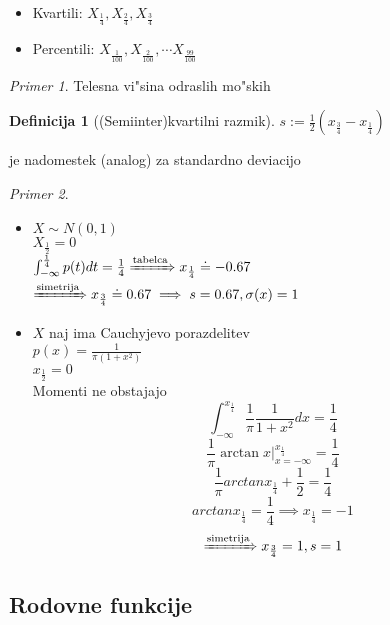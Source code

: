 \documentclass[a4paper,12pt]{article}
\theoremstyle{definition}
\newtheorem{defn}[counter]{Definicija}
\theoremstyle{remark}
\newtheorem*{ex}{Primer}
\begin{document}
\begin{itemize}
    \item Kvartili: $X_{\frac{1}{4}}, X_{\frac{2}{4}}, X_{\frac{3}{4}}$
    \item Percentili: $X_{\frac{1}{100}}, X_{\frac{2}{100}}, \cdots X_{\frac{99}{100}}$
\end{itemize}

\begin{ex}
    Telesna vi"sina odraslih mo"skih
\end{ex}

\begin{defn}[(Semiinter)kvartilni razmik]
    $s := \frac{1}{2} (x_{\frac{3}{4}} - x_{\frac{1}{4}})$
\end{defn}

je nadomestek (analog) za standardno deviacijo

\begin{ex} \text{} \\
    \begin{itemize}
        \item $X \sim N(0,1)$ \\
            $X_{\frac{1}{2}} = 0$ \\
            $\int_{-\infty}^{\frac{1}{4}} p(t) dt = \frac{1}{4} \xRightarrow{\text{tabelca}} x_{\frac{1}{4}} \doteq -0.67$ \\
            $\xRightarrow{\text{simetrija}} x_{\frac{3}{4}} \doteq 0.67 \implies s = 0.67, \sigma(x) = 1$ \\
        \item $X$ naj ima Cauchyjevo porazdelitev \\
            $p(x) = \frac{1}{\pi(1 + x^2)}$ \\
            $x_{\frac{1}{2}} = 0$ \\
            Momenti ne obstajajo \\
            \[\int_{-\infty}^{x_{\frac{1}{4}}} \frac{1}{\pi} \frac{1}{1 + x^2} dx = \frac{1}{4} \]
            \[\frac{1}{\pi} \arctan x \vert_{x=-\infty}^{x_{\frac{1}{4}}} = \frac{1}{4} \]
            \[\frac{1}{\pi} arctan x_{\frac{1}{4}} + \frac{1}{2} = \frac{1}{4}\]
            \[arctan x_{\frac{1}{4}} = \frac{1}{4} \implies x_{\frac{1}{4}} = -1\]
            \[\xRightarrow{\text{simetrija}} x_{\frac{3}{4}} = 1, s = 1\]
    \end{itemize}
\end{ex}

\subsection{Rodovne funkcije}
\end{document}
